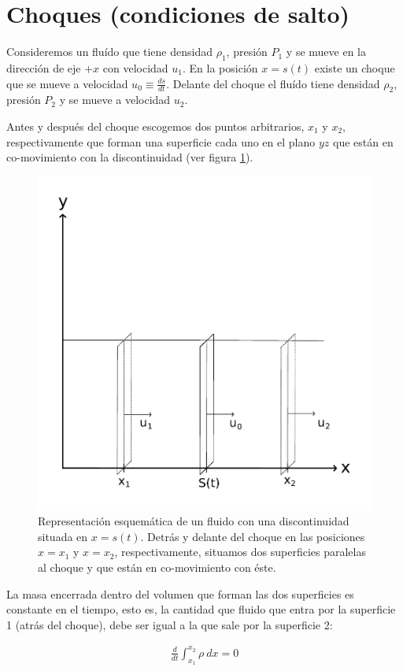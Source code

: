 \section{Choques (condiciones de salto)}

Consideremos un fluído que tiene densidad $\rho_1$, presión $P_1$ y se mueve en la dirección de eje $+x$ con velocidad $u_1$. En la posición $x = s(t)$ existe un choque que se mueve a velocidad $u_0\equiv \frac{ds}{dt}$. Delante del choque el fluído tiene densidad $\rho_2$, presión $P_2$ y se mueve a velocidad $u_2$.

Antes y después del choque escogemos dos puntos arbitrarios, $x_1$ y $x_2$, respectivamente que forman una superficie cada uno en el plano $yz$ que están en co-movimiento con la discontinuidad (ver figura \ref{fig:shock}). 

\begin{figure}
  \centering
  \includegraphics[width=0.7\linewidth]{./Figures/shock}
  \caption[Esquema de discontinuidad de contacto.]{Representación esquemática de un fluido con una discontinuidad situada en $x=s(t)$. Detrás y delante del choque en las posiciones $x=x_1$ y $x=x_2$, respectivamente, situamos dos superficies paralelas al choque y que están en co-movimiento con éste.}
  \label{fig:shock}
\end{figure}

La masa encerrada dentro del volumen que forman las dos superficies es constante en el tiempo, esto es, la cantidad que fluido que entra por la superficie 1 (atrás del choque), debe ser igual a la que sale por la superficie 2:

\begin{align}
  \frac{d}{dt}\int^{x_2}_{x_1} \rho~dx = 0 \label{eq:rho-dx}
\end{align}

